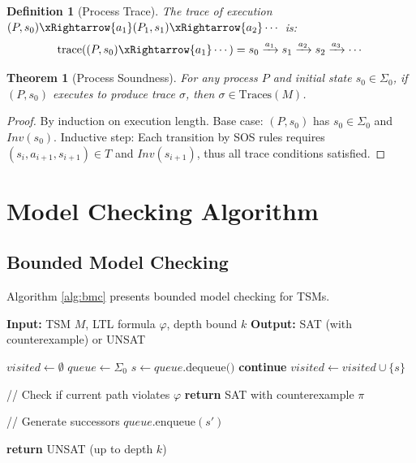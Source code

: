 \documentclass[conference]{IEEEtran}
\newtheorem{theorem}{Theorem}
\newtheorem{definition}{Definition}
\begin{document}
\begin{definition}[Process Trace]
The \textit{trace} of execution $(P, s_0) \xRightarrow{a_1} (P_1, s_1) \xRightarrow{a_2} \cdots$ is:
\begin{equation}
\text{trace}((P, s_0) \xRightarrow{a_1} \cdots) = s_0 \xrightarrow{a_1} s_1 \xrightarrow{a_2} s_2 \xrightarrow{a_3} \cdots
\end{equation}
\end{definition}

\begin{theorem}[Process Soundness]
\label{thm:process_soundness}
For any process $P$ and initial state $s_0 \in \Sigma_0$, if $(P, s_0)$ executes to produce trace $\sigma$, then $\sigma \in \text{Traces}(M)$.
\end{theorem}

\begin{proof}
By induction on execution length. Base case: $(P, s_0)$ has $s_0 \in \Sigma_0$ and $Inv(s_0)$. Inductive step: Each transition by SOS rules requires $(s_i, a_{i+1}, s_{i+1}) \in T$ and $Inv(s_{i+1})$, thus all trace conditions satisfied.
\end{proof}

\section{Model Checking Algorithm}

\subsection{Bounded Model Checking}

Algorithm \ref{alg:bmc} presents bounded model checking for TSMs.

\begin{algorithmic}
\STATE \textbf{Input:} TSM $M$, LTL formula $\varphi$, depth bound $k$
\STATE \textbf{Output:} SAT (with counterexample) or UNSAT

\STATE $visited \gets \emptyset$
\STATE $queue \gets \Sigma_0$
  \STATE $s \gets queue.\text{dequeue()}$
    \STATE \textbf{continue}
  \ENDIF
  \STATE $visited \gets visited \cup \{s\}$

  \STATE // Check if current path violates $\varphi$
    \STATE \textbf{return} SAT with counterexample $\pi$
  \ENDIF

  \STATE // Generate successors
      \STATE $queue.\text{enqueue}(s')$
    \ENDIF
  \ENDFOR
\ENDWHILE

\STATE \textbf{return} UNSAT (up to depth $k$)
\end{algorithmic}
\end{document}
